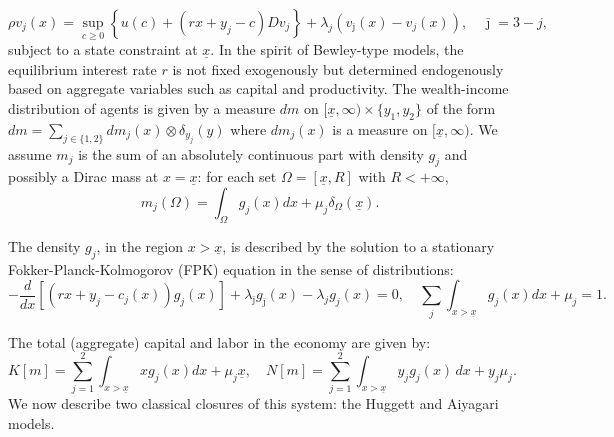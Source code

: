 \documentclass[11pt]{article}
\numberwithin{equation}{section}
\theoremstyle{Claim}
\newcommand{\ux}{{\underline x}}
\newcommand{\beq}{\begin{equation}}
\newcommand{\eeq}{\end{equation}}
\theoremstyle{plain}
\begin{document}
$$
\rho v_j(x) = \sup_{c \ge 0} \left\{ u(c) + (r x + y_j - c) Dv_j \right\} + \lambda_j (v_{\bar{\jmath}}(x) - v_j(x)), \quad \bar{\jmath} = 3 - j,
$$
subject to a state constraint at $\underline{x}$. 
In the spirit of Bewley-type models, the equilibrium interest rate $r$ is not fixed exogenously but determined endogenously based on aggregate variables such as capital and productivity. The wealth-income distribution of agents is given by a measure $dm$ on $[\ux,\infty)\times \{y_1,y_2\}$ of the form $dm=\sum_{j\in\{1,2\}}dm_{j}(x)\otimes\delta_{y_j}(y)$ where $dm_{j}(x)$ is a measure on $[\ux,\infty)$. We assume $m_j$ is the sum of  an absolutely continuous part with density $g_j$ and possibly a Dirac mass at $x=\ux$: for each set $\Omega= [\ux,R]$ with $R<+\infty$, 
\beq\label{eq:mg}
m_j(\Omega)=\int_{\Omega}g_j(x)dx+\mu_j\delta_{\Omega}(\ux).
\eeq

The density $g_j$, in the region $x>\ux$, is described by the solution to a stationary Fokker-Planck-Kolmogorov (FPK) equation in the sense of distributions:
$$
- \frac{d}{dx} \left[ (rx + y_j - c_j(x)) g_j(x) \right] + \lambda_{\bar \jmath}g_{\bar \jmath}(x) - \lambda_j g_j(x) = 0,\quad \sum_j\int_{x>\ux}g_j(x)dx+\mu_j=1.
$$

The total (aggregate) capital and labor in the economy are given by:
\begin{equation}\label{def K N}
	K[m] = \sum_{j=1}^{2} \int_{x > \underline{x}} x g_j(x)dx+\mu_j\ux , \quad N[m] = \sum_{j=1}^{2} \int_{x> \underline{x}} y_j g_j(x) \, dx+y_j\mu_j.
\end{equation}
We now describe two classical closures of this system: the Huggett and Aiyagari models.\par
\end{document}

